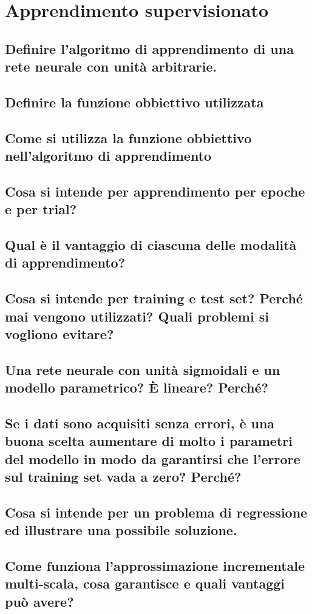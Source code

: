 \documentclass[\main/main.tex]{subfiles}
\begin{document}
\section{Apprendimento supervisionato}

\subsection{Definire l'algoritmo di apprendimento di una rete neurale con unità arbitrarie.}
\subsection{Definire la funzione obbiettivo utilizzata}
\subsection{Come si utilizza la funzione obbiettivo nell'algoritmo di apprendimento}
\subsection{Cosa si intende per apprendimento per epoche e per trial?}
\subsection{Qual è il vantaggio di ciascuna delle modalità di apprendimento?}
\subsection{Cosa si intende per training e test set? Perché mai vengono utilizzati? Quali problemi si vogliono evitare?}
\subsection{Una rete neurale con unità sigmoidali e un modello parametrico? È lineare? Perché?}
\subsection{Se i dati sono acquisiti senza errori, è una buona scelta aumentare di molto i parametri del modello in modo da garantirsi che l'errore sul training set vada a zero? Perché?}
\subsection{Cosa si intende per un problema di regressione ed illustrare una possibile soluzione.}
\subsection{Come funziona l'approssimazione incrementale multi-scala, cosa garantisce e quali vantaggi può avere?}
\end{document}
